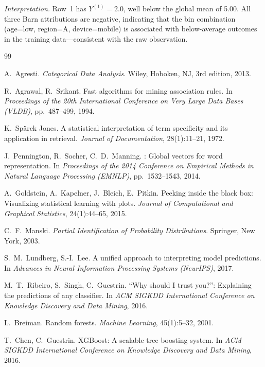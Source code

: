 \documentclass[11pt]{article}
\begin{document}
\noindent
\emph{Interpretation.}
Row~1 has $Y^{(1)} = 2.0$, well below the global mean of 5.00.
All three Barn attributions are negative, indicating that the bin combination (age=low, region=A, device=mobile) is associated with below-average outcomes in the training data---consistent with the raw observation.

\begin{thebibliography}{99}

A.~Agresti.
\newblock \emph{Categorical Data Analysis}.
\newblock Wiley, Hoboken, NJ, 3rd edition, 2013.

R.~Agrawal, R.~Srikant.
\newblock Fast algorithms for mining association rules.
\newblock In \emph{Proceedings of the 20th International Conference on Very Large Data Bases (VLDB)}, pp.\ 487--499, 1994.

K.~Sp\"{a}rck Jones.
\newblock A statistical interpretation of term specificity and its application in retrieval.
\newblock \emph{Journal of Documentation}, 28(1):11--21, 1972.

J.~Pennington, R.~Socher, C.~D.~Manning.
: Global vectors for word representation.
\newblock In \emph{Proceedings of the 2014 Conference on Empirical Methods in Natural Language Processing (EMNLP)}, pp.\ 1532--1543, 2014.

A.~Goldstein, A.~Kapelner, J.~Bleich, E.~Pitkin.
\newblock Peeking inside the black box: Visualizing statistical learning with plots.
\newblock \emph{Journal of Computational and Graphical Statistics}, 24(1):44--65, 2015.

C.~F.~Manski.
\newblock \emph{Partial Identification of Probability Distributions}.
\newblock Springer, New York, 2003.

S.~M.~Lundberg, S.-I.~Lee.
\newblock A unified approach to interpreting model predictions.
\newblock In \emph{Advances in Neural Information Processing Systems (NeurIPS)}, 2017.

M.~T.~Ribeiro, S.~Singh, C.~Guestrin.
\newblock ``Why should I trust you?'': Explaining the predictions of any classifier.
\newblock In \emph{ACM SIGKDD International Conference on Knowledge Discovery and Data Mining}, 2016.

L.~Breiman.
\newblock Random forests.
\newblock \emph{Machine Learning}, 45(1):5--32, 2001.

T.~Chen, C.~Guestrin.
\newblock XGBoost: A scalable tree boosting system.
\newblock In \emph{ACM SIGKDD International Conference on Knowledge Discovery and Data Mining}, 2016.


\end{thebibliography}
\end{document}
